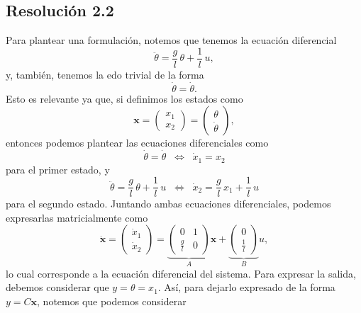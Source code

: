 \documentclass[
  11pt,
  letterpaper,
   addpoints,
  answers
  ]{exam}
\begin{document}
\begin{questions}
\begin{solution}
\subsection*{Resolución 2.2}

Para plantear una formulación, notemos que tenemos la ecuación diferencial
\begin{equation}
\ddot{\theta}=\frac{g}{l}\,\theta+\frac{1}{l}\,u,
\end{equation}
y, también, tenemos la edo trivial de la forma
\begin{equation}
\dot{\theta}=\dot{\theta}.
\end{equation}
Esto es relevante ya que, si definimos los estados como
\begin{equation}
\mathbf{x}=
\begin{pmatrix}
x_1\\[2pt]
x_2
\end{pmatrix}
=
\begin{pmatrix}
\theta\\[2pt]
\dot{\theta}
\end{pmatrix},
\end{equation}
entonces podemos plantear las ecuaciones diferenciales como
\begin{equation}
\dot{\theta}=\dot{\theta}\;\;\Leftrightarrow\;\;\dot{x}_1=x_2
\end{equation}
para el primer estado, y
\begin{equation}
\ddot{\theta}=\frac{g}{l}\,\theta+\frac{1}{l}\,u\;\;\Leftrightarrow\;\;\dot{x}_2=\frac{g}{l}\,x_1+\frac{1}{l}\,u
\end{equation}
para el segundo estado. Juntando ambas ecuaciones diferenciales, podemos expresarlas matricialmente como
\begin{equation}
\dot{\mathbf{x}}=
\begin{pmatrix}
\dot{x}_1\\[2pt]
\dot{x}_2
\end{pmatrix}
=
\underbrace{\begin{pmatrix}
0&1\\[2pt]
\frac{g}{l}&0
\end{pmatrix}}_{A}\mathbf{x}+
\underbrace{\begin{pmatrix}
0\\[2pt]
\frac{1}{l}
\end{pmatrix}}_{B}u,
\end{equation}
lo cual corresponde a la ecuación diferencial del sistema. Para expresar la salida, debemos considerar que $y=\theta= x_1$. Así, para dejarlo expresado de la forma $y=C\mathbf{x}$, notemos que podemos considerar

\end{solution}
\end{questions}
\end{document}
